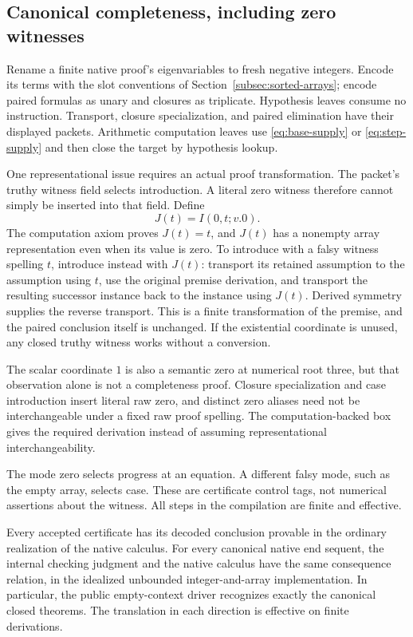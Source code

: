 \subsection{Canonical completeness, including zero witnesses}
\label{subsec:canonical-completeness}

Rename a finite native proof's eigenvariables to fresh negative integers.
Encode its terms with the slot conventions of
Section~\ref{subsec:sorted-arrays}; encode paired formulas as unary and
closures as triplicate.  Hypothesis leaves consume no instruction.
Transport, closure specialization, and paired elimination have their
displayed packets.  Arithmetic computation leaves use
\eqref{eq:base-supply} or \eqref{eq:step-supply} and then close the
target by hypothesis lookup.

One representational issue requires an actual proof transformation.
The packet's truthy witness field selects introduction.  A literal zero
witness therefore cannot simply be inserted into that field.  Define
\[
                 J(t)=I(0,t;v.0).
\]
The computation axiom proves $J(t)=t$, and $J(t)$ has a nonempty array
representation even when its value is zero.  To introduce with a falsy
witness spelling $t$, introduce instead with $J(t)$: transport its
retained assumption to the assumption using $t$, use the original
premise derivation, and transport the resulting successor instance
back to the instance using $J(t)$.  Derived symmetry supplies the
reverse transport.  This is a finite transformation of the premise,
and the paired conclusion itself is unchanged.  If the existential
coordinate is unused, any closed truthy witness works without a
conversion.

The scalar coordinate $1$ is also a semantic zero at numerical root
three, but that observation alone is not a completeness proof.  Closure
specialization and case introduction insert literal raw zero, and
distinct zero aliases need not be interchangeable under a fixed raw
proof spelling.  The computation-backed box gives the required
derivation instead of assuming representational interchangeability.

The mode zero selects progress at an equation.  A different falsy
mode, such as the empty array, selects case.  These are certificate
control tags, not numerical assertions about the witness.  All steps
in the compilation are finite and effective.

\begin{theorem}
\label{thm:arity-checker}
Every accepted certificate has its decoded conclusion provable in the
ordinary realization of the native calculus.  For every canonical
native end sequent, the internal checking judgment and the native
calculus have the same consequence relation, in the idealized
unbounded integer-and-array implementation.  In particular, the public
empty-context driver recognizes exactly the canonical closed theorems.
The translation in each direction is effective on finite derivations.
\end{theorem}

